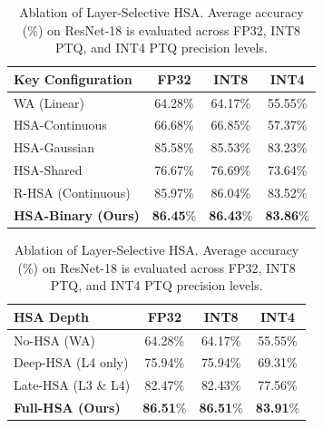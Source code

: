 \documentclass{article}
\theoremstyle{plain}
\theoremstyle{definition}
\theoremstyle{remark}
\begin{document}
\begin{table}[t]
\begin{minipage}{0.48\textwidth}
\centering
\caption{Ablation of phase key design. Average accuracy (\%) on ResNet-18 is evaluated across FP32, INT8 PTQ, and INT4 PTQ precision levels.}
\label{tab:key_design}
\vskip 0.05in
\begin{footnotesize}
\setlength{\tabcolsep}{3pt}
\begin{tabular}{lccc}
\toprule
Key Configuration & FP32 & INT8 & INT4 \\
\midrule
WA (Linear) & 64.28\% & 64.17\% & 55.55\% \\
HSA-Continuous & 66.68\% & 66.85\% & 57.37\% \\
HSA-Gaussian & 85.58\% & 85.53\% & 83.23\% \\
HSA-Shared & 76.67\% & 76.69\% & 73.64\% \\
R-HSA (Continuous) & 85.97\% & 86.04\% & 83.52\% \\
\midrule
\textbf{HSA-Binary (Ours)} & \textbf{86.45}\% & \textbf{86.43}\% & \textbf{83.86}\% \\
\bottomrule
\end{tabular}
\end{footnotesize}
\end{minipage}
\hfill
\begin{minipage}{0.48\textwidth}
\centering
\caption{Ablation of Layer-Selective HSA. Average accuracy (\%) on ResNet-18 is evaluated across FP32, INT8 PTQ, and INT4 PTQ precision levels.}
\label{tab:layer_selective}
\vskip 0.05in
\begin{footnotesize}
\setlength{\tabcolsep}{3pt}
\begin{tabular}{lccc}
\toprule
HSA Depth & FP32 & INT8 & INT4 \\
\midrule
No-HSA (WA) & 64.28\% & 64.17\% & 55.55\% \\
Deep-HSA (L4 only) & 75.94\% & 75.94\% & 69.31\% \\
Late-HSA (L3 \& L4) & 82.47\% & 82.43\% & 77.56\% \\
\midrule
\textbf{Full-HSA (Ours)} & \textbf{86.51}\% & \textbf{86.51}\% & \textbf{83.91}\% \\
\bottomrule
\end{tabular}
\end{footnotesize}
\end{minipage}
\vskip -0.18in
\end{table}
\end{document}
